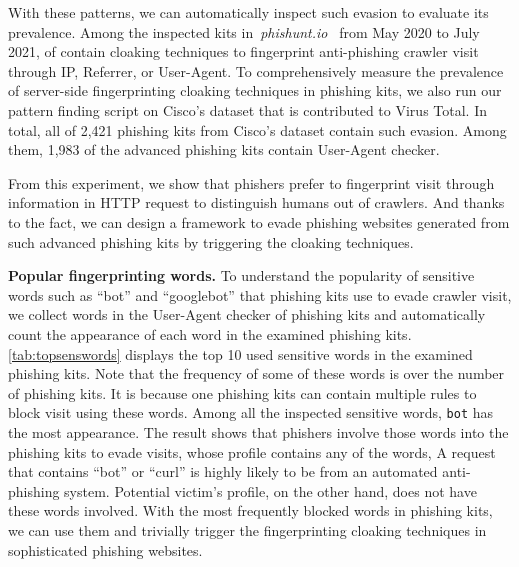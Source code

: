 With these patterns, we can automatically inspect such evasion to evaluate its prevalence.
Among the inspected kits in~\emph{phishunt.io}~\cite{phishunt} from May 2020 to July 2021, \fpphishingkit of \totalphishingkit contain cloaking techniques to fingerprint anti-phishing crawler visit through IP, Referrer, or User-Agent.
To comprehensively measure the prevalence of server-side fingerprinting cloaking techniques in phishing kits,
we also run our pattern finding script on Cisco's dataset that is contributed to Virus Total.
In total, all of 2,421 phishing kits from Cisco's dataset contain such evasion.
Among them, 1,983 of the advanced phishing kits contain User-Agent checker.

From this experiment,
we show that phishers prefer to fingerprint visit through information in HTTP request to distinguish humans out of crawlers.
And thanks to the fact, 
we can design a framework to evade phishing websites generated from such advanced phishing kits by triggering the cloaking techniques.

\topsenswords

\noindent
\textbf{Popular fingerprinting words.}
To understand the popularity of sensitive words such as ``bot'' and ``googlebot'' that phishing kits use to evade crawler visit,
we collect \numsenswords words in the User-Agent checker of phishing kits and automatically count the appearance of each word in the examined phishing kits.
\autoref{tab:topsenswords} displays the top 10 used sensitive words in the examined phishing kits.
Note that the frequency of some of these words is over the number of phishing kits.
It is because one phishing kits can contain multiple rules to block visit using these words.
Among all the inspected sensitive words, \texttt{bot} has the most appearance.
The result shows that phishers involve those words into the phishing kits to evade visits, whose profile contains any of the words,
A request that contains ``bot'' or ``curl'' is highly likely to be from an automated anti-phishing system.
Potential victim's profile, on the other hand, does not have these words involved.
With the most frequently blocked words in phishing kits, we can use them and trivially trigger the fingerprinting cloaking techniques in sophisticated phishing websites.